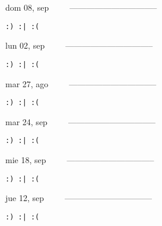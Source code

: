 \documentclass[letterpaper,10pt]{article}
\begin{document}
\begin{multicols}{3}
{dom 08, sep\ \ \ \ \ --------------------------------}
\begin{flushright}\begin{small}\texttt{:) :| :(}\end{small}\end{flushright}
\vfill
{lun 02, sep\ \ \ \ \ --------------------------------}
\begin{flushright}\begin{small}\texttt{:) :| :(}\end{small}\end{flushright}\par
\vfill
{mar 27, ago\ \ \ \ \ --------------------------------}
\begin{flushright}\begin{small}\texttt{:) :| :(}\end{small}\end{flushright}\par
\vfill
\end{multicols}
\vspace{1.05cm}

\begin{multicols}{3}
{mar 24, sep\ \ \ \ \ --------------------------------}
\begin{flushright}\begin{small}\texttt{:) :| :(}\end{small}\end{flushright}
\vfill
{mie 18, sep\ \ \ \ \ --------------------------------}
\begin{flushright}\begin{small}\texttt{:) :| :(}\end{small}\end{flushright}\par
\vfill
{jue 12, sep\ \ \ \ \ --------------------------------}
\begin{flushright}\begin{small}\texttt{:) :| :(}\end{small}\end{flushright}\par
\vfill
\end{multicols}
\vspace{1.05cm}
\end{document}
